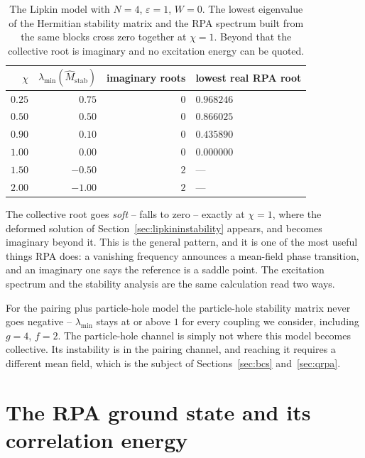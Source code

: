 \begin{table}[h]
\centering
\renewcommand{\arraystretch}{1.25}
\setlength{\tabcolsep}{12pt}
\begin{tabular}{rrrl}
\toprule
$\chi$ & $\lambda_{\min}(\hat{M}_{\mathrm{stab}})$
  & imaginary roots & lowest real RPA root\\
\midrule
$0.25$ & $\phantom{-}0.75$ & $0$ & $0.968246$\\
$0.50$ & $\phantom{-}0.50$ & $0$ & $0.866025$\\
$0.90$ & $\phantom{-}0.10$ & $0$ & $0.435890$\\
$1.00$ & $\phantom{-}0.00$ & $0$ & $0.000000$\\
$1.50$ & $-0.50$ & $2$ & ---\\
$2.00$ & $-1.00$ & $2$ & ---\\
\bottomrule
\end{tabular}
\caption{The Lipkin model with $N=4$, $\varepsilon=1$, $W=0$.  The lowest
eigenvalue of the Hermitian stability matrix and the RPA spectrum built from
the same blocks cross zero together at $\chi=1$.  Beyond that the collective
root is imaginary and no excitation energy can be quoted.}
\label{tab:rpastability}
\end{table}

The collective root goes \emph{soft} -- falls to zero -- exactly at $\chi=1$,
where the deformed solution of
Section~\ref{sec:lipkininstability} appears, and becomes imaginary beyond it.
This is the general pattern, and it is one of the most useful things RPA does:
a vanishing frequency announces a mean-field phase transition, and an
imaginary one says the reference is a saddle point.  The excitation spectrum
and the stability analysis are the same calculation read two ways.

For the pairing plus particle-hole model the particle-hole stability matrix
never goes negative -- $\lambda_{\min}$ stays at or above $1$ for every
coupling we consider, including $g=4$, $f=2$.  The particle-hole channel is
simply not where this model becomes collective.  Its instability is in the
pairing channel, and reaching it requires a different mean field, which is the
subject of Sections~\ref{sec:bcs} and~\ref{sec:qrpa}.

\section{The RPA ground state and its correlation energy}
\label{sec:rpacorrelation}

